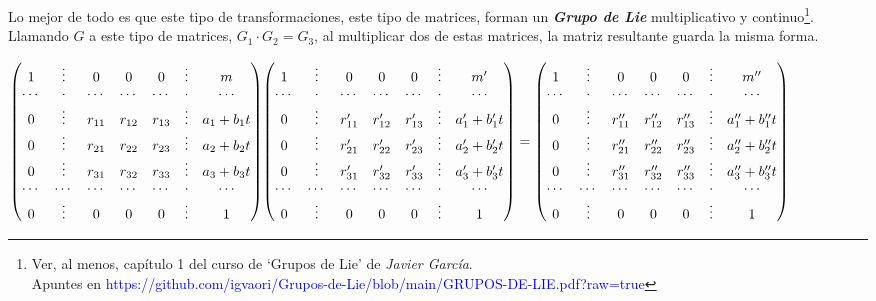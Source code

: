 Lo mejor de todo es que este tipo de transformaciones, este tipo de matrices, forman un \textbf{\emph{Grupo de Lie}} multiplicativo y continuo\footnote{ Ver, al menos, capítulo 1 del curso de `Grupos de Lie' de 	\emph{Javier García}. \\ Apuntes en \textcolor{blue}{https://github.com/igvaori/Grupos-de-Lie/blob/main/GRUPOS-DE-LIE.pdf?raw=true} }. Llamando $G$ a este tipo de matrices, $G_1\cdot G_2=G_3$, al multiplicar dos de estas matrices, la matriz resultante guarda la misma forma.



\begin{tiny}
\textcolor{gris}
{$\mqty(
1&\vdots& 0&0&0& \vdots & m\\
\cdots&\cdot&\cdots&\cdots&\cdots&\cdot&\cdots\\
0&\vdots&r_{11}&r_{12}&r_{13}&\vdots&a_1+b_1t\\
0&\vdots&r_{21}&r_{22}&r_{23}&\vdots&a_2+b_2t\\
0&\vdots&r_{31}&r_{32}&r_{33}&\vdots&a_3+b_3t\\
\cdots&\cdots&\cdots &\cdots&\cdots&\cdot&\cdots\\
0&\vdots&0&0&0&\vdots&1)  \mqty(
1&\vdots& 0&0&0& \vdots & m'\\
\cdots&\cdot&\cdots&\cdots&\cdots&\cdot&\cdots\\
0&\vdots&r'_{11}&r'_{12}&r'_{13}&\vdots&a'_1+b'_1t\\
0&\vdots&r'_{21}&r'_{22}&r'_{23}&\vdots&a'_2+b'_2t\\
0&\vdots&r'_{31}&r'_{32}&r'_{33}&\vdots&a'_3+b'_3t\\
\cdots&\cdots&\cdots &\cdots&\cdots&\cdot&\cdots\\
0&\vdots&0&0&0&\vdots&1)  =  \mqty(
1&\vdots& 0&0&0& \vdots & m''\\
\cdots&\cdot&\cdots&\cdots&\cdots&\cdot&\cdots\\
0&\vdots&r''_{11}&r''_{12}&r''_{13}&\vdots&a''_1+b''_1t\\
0&\vdots&r''_{21}&r''_{22}&r''_{23}&\vdots&a''_2+b''_2t\\
0&\vdots&r''_{31}&r''_{32}&r''_{33}&\vdots&a''_3+b''_3t\\
\cdots&\cdots&\cdots &\cdots&\cdots&\cdot&\cdots\\
0&\vdots&0&0&0&\vdots&1)$}
\end{tiny}

